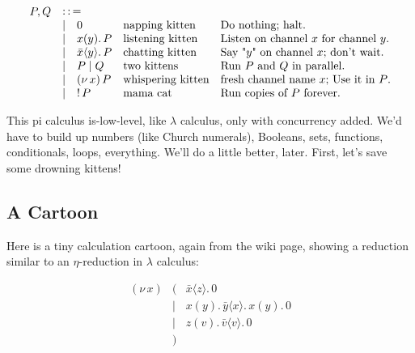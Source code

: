 \documentclass[10pt,oneside,x11names]{article}
\newcommand{\Coloneqq}{\mathrel{\vcenter{\hbox{$:\,:\,=$}}{}}}
\newcommand\napping    [0]{0}
\newcommand\chatting   [3]{\bar{#1}\langle{#2}\rangle{}.\,#3}
\newcommand\listening  [3]{#1(#2).\,#3}
\newcommand\two        [2]{#1\mathrel{\vert}{#2}}
\newcommand\whispering [2]{(\nu\,#1)\,{#2}}
\newcommand\mama       [1]{!\,{#1}}
\newcommand{\kitOne}{\chatting{x}{z}{\napping}}
\newcommand{\kitTwo}{\listening{x}{y}{\chatting{y}{x}{\listening{x}{y}{\napping}}}}
\newcommand{\kitThree}{\listening{z}{v}{\chatting{v}{v}{\napping}}}
\theoremstyle{definition}
\theoremstyle{warning}
\begin{document}
\begin{equation}
\begin{array}{clll}
  P, Q & \Coloneqq \\
       & | \quad \napping            & \textrm{napping kitten}    & \textrm{Do nothing; halt.}                                    \\
       & | \quad \listening{x}{y}{P} & \textrm{listening kitten}  & \textrm{Listen on channel }x\textrm{ for channel }y\textrm{.} \\
       & | \quad \chatting{x}{y}{P}  & \textrm{chatting kitten}   & \textrm{Say "}y\textrm{" on channel }x\textrm{; don't wait.}  \\
       & | \quad \two{P}{Q}          & \textrm{two kittens}       & \textrm{Run }P\textrm{ and }Q\textrm{ in parallel.}           \\
       & | \quad \whispering{x}{P}   & \textrm{whispering kitten} & \textrm{fresh channel name }x\textrm{; Use it in }P\textrm{.} \\
       & | \quad \mama{P}            & \textrm{mama cat}          & \textrm{Run copies of }P\textrm{ forever.} \\
\end{array}
\end{equation}

This pi calculus is-low-level, like \(\lambda\) calculus, only with
concurrency added. We'd have to build up numbers (like Church
numerals), Booleans, sets, functions, conditionals, loops,
everything. We'll do a little better, later. First, let's save
some drowning kittens!

\subsection{A Cartoon}
\label{sec:org2948276}

Here is a tiny calculation cartoon, again from the wiki page,
showing a reduction similar to an \(\eta\)\nobreakdash-reduction in
\(\lambda\) calculus:

\begin{equation}
\begin{array}{clll}
  (\nu\,x) & (      & \kitOne \\
           & \vert  & \kitTwo \\
           & \vert  & \kitThree \\
       {}  & )
\end{array}
\end{equation}
\end{document}
